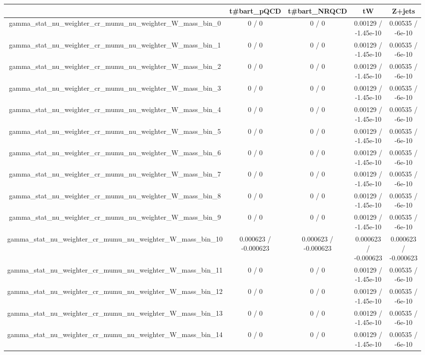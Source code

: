 \documentclass[10pt]{article}
\begin{document}
\begin{table}[htbp]
\begin{center}
\begin{tabular}{|c|c|c|c|c|}
\hline 
      & t#bar{t}_{pQCD}      & t#bar{t}_{NRQCD}      & tW      & Z+jets \\ 
\hline 
  gamma_stat_nu_weighter_cr_mumu_nu_weighter_W_mass_bin_0 & 0 / 0 & 0 / 0 & 0.00129 / -1.45e-10 & 0.00535 / -6e-10 \\ 
  gamma_stat_nu_weighter_cr_mumu_nu_weighter_W_mass_bin_1 & 0 / 0 & 0 / 0 & 0.00129 / -1.45e-10 & 0.00535 / -6e-10 \\ 
  gamma_stat_nu_weighter_cr_mumu_nu_weighter_W_mass_bin_2 & 0 / 0 & 0 / 0 & 0.00129 / -1.45e-10 & 0.00535 / -6e-10 \\ 
  gamma_stat_nu_weighter_cr_mumu_nu_weighter_W_mass_bin_3 & 0 / 0 & 0 / 0 & 0.00129 / -1.45e-10 & 0.00535 / -6e-10 \\ 
  gamma_stat_nu_weighter_cr_mumu_nu_weighter_W_mass_bin_4 & 0 / 0 & 0 / 0 & 0.00129 / -1.45e-10 & 0.00535 / -6e-10 \\ 
  gamma_stat_nu_weighter_cr_mumu_nu_weighter_W_mass_bin_5 & 0 / 0 & 0 / 0 & 0.00129 / -1.45e-10 & 0.00535 / -6e-10 \\ 
  gamma_stat_nu_weighter_cr_mumu_nu_weighter_W_mass_bin_6 & 0 / 0 & 0 / 0 & 0.00129 / -1.45e-10 & 0.00535 / -6e-10 \\ 
  gamma_stat_nu_weighter_cr_mumu_nu_weighter_W_mass_bin_7 & 0 / 0 & 0 / 0 & 0.00129 / -1.45e-10 & 0.00535 / -6e-10 \\ 
  gamma_stat_nu_weighter_cr_mumu_nu_weighter_W_mass_bin_8 & 0 / 0 & 0 / 0 & 0.00129 / -1.45e-10 & 0.00535 / -6e-10 \\ 
  gamma_stat_nu_weighter_cr_mumu_nu_weighter_W_mass_bin_9 & 0 / 0 & 0 / 0 & 0.00129 / -1.45e-10 & 0.00535 / -6e-10 \\ 
  gamma_stat_nu_weighter_cr_mumu_nu_weighter_W_mass_bin_10 & 0.000623 / -0.000623 & 0.000623 / -0.000623 & 0.000623 / -0.000623 & 0.000623 / -0.000623 \\ 
  gamma_stat_nu_weighter_cr_mumu_nu_weighter_W_mass_bin_11 & 0 / 0 & 0 / 0 & 0.00129 / -1.45e-10 & 0.00535 / -6e-10 \\ 
  gamma_stat_nu_weighter_cr_mumu_nu_weighter_W_mass_bin_12 & 0 / 0 & 0 / 0 & 0.00129 / -1.45e-10 & 0.00535 / -6e-10 \\ 
  gamma_stat_nu_weighter_cr_mumu_nu_weighter_W_mass_bin_13 & 0 / 0 & 0 / 0 & 0.00129 / -1.45e-10 & 0.00535 / -6e-10 \\ 
  gamma_stat_nu_weighter_cr_mumu_nu_weighter_W_mass_bin_14 & 0 / 0 & 0 / 0 & 0.00129 / -1.45e-10 & 0.00535 / -6e-10 \\ 

\end{tabular}
\end{center}
\end{table}
\end{document}
